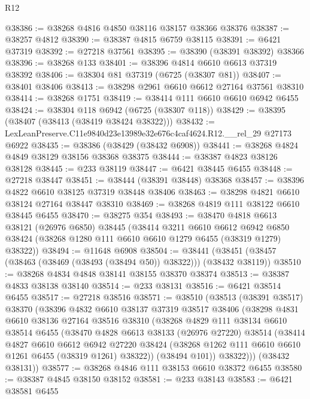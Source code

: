 \begin{lexlean}{R12}
\begin{coremodule}
@38386 := @38268 @4816 @4850 @38116 @38157 @38366 @38376
@38387 := @38257 @4812
@38390 := @38387 @4815 @6759 @38115
@38391 := @6421 @37319
@38392 := @27218 @37561
@38395 := @38390 (@38391 @38392) @38366
@38396 := @38268 @133
@38401 := @38396 @4814 @6610 @6613 @37319 @38392
@38406 := @38304 @81 @37319 (@6725 (@38307 @81))
@38407 := @38401 @38406
@38413 := @38298 @2961 @6610 @6612 @27164 @37561 @38310
@38414 := @38268 @1751
@38419 := @38414 @111 @6610 @6610 @6942 @6455
@38424 := @38304 @118 @6942 (@6725 (@38307 @118))
@38429 := @38395 (@38407 (@38413 (@38419 @38424 @38322)))
@38432 := LexLeanPreserve.C11e9840d23e13989e32e676c4caf4624.R12.__rel_29 @27173 @6922
@38435 := @38386 (@38429 (@38432 @6908))
@38441 := @38268 @4824 @4849 @38129 @38156 @38368 @38375
@38444 := @38387 @4823 @38126 @38128
@38445 := @233 @38119
@38447 := @6421 @38445 @6455
@38448 := @27218 @38447
@38451 := @38444 (@38391 @38448) @38368
@38457 := @38396 @4822 @6610 @38125 @37319 @38448 @38406
@38463 := @38298 @4821 @6610 @38124 @27164 @38447 @38310
@38469 := @38268 @4819 @111 @38122 @6610 @38445 @6455
@38470 := @38275 @354
@38493 := @38470
    @4818
    @6613
    @38121
    (@26976 @6850)
    @38445
    (@38414
      @3211
      @6610
      @6612
      @6942
      @6850
      @38424
      (@38268 @1280 @111 @6610 @6610 @1279 @6455 (@38319 @1279) @38322))
@38494 := @11648 @6908
@38504 := @38441 (@38451 (@38457 (@38463 (@38469 (@38493 (@38494 @50)) @38322))) (@38432 @38119))
@38510 := @38268 @4834 @4848 @38141 @38155 @38370 @38374
@38513 := @38387 @4833 @38138 @38140
@38514 := @233 @38131
@38516 := @6421 @38514 @6455
@38517 := @27218 @38516
@38571 := @38510
    (@38513
      (@38391 @38517)
      @38370
      (@38396
        @4832
        @6610
        @38137
        @37319
        @38517
        @38406
        (@38298
          @4831
          @6610
          @38136
          @27164
          @38516
          @38310
          (@38268
            @4829
            @111
            @38134
            @6610
            @38514
            @6455
            (@38470
              @4828
              @6613
              @38133
              (@26976 @27220)
              @38514
              (@38414
                @4827
                @6610
                @6612
                @6942
                @27220
                @38424
                (@38268 @1262 @111 @6610 @6610 @1261 @6455 (@38319 @1261) @38322))
              (@38494 @101))
            @38322)))
      (@38432 @38131))
@38577 := @38268 @4846 @111 @38153 @6610 @38372 @6455
@38580 := @38387 @4845 @38150 @38152
@38581 := @233 @38143
@38583 := @6421 @38581 @6455

\end{coremodule}
\end{lexlean}

